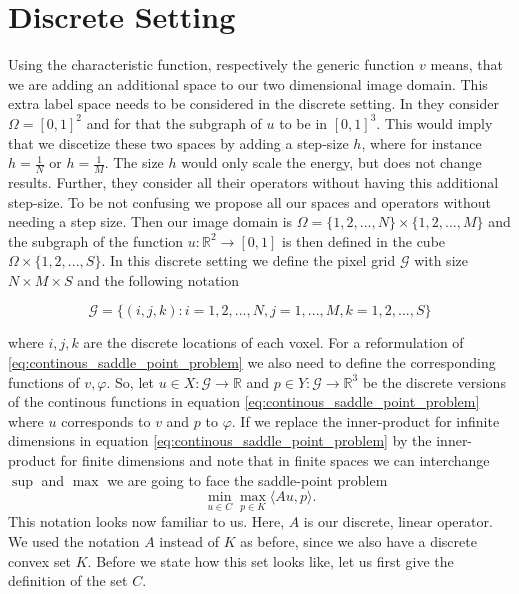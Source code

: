 \section{Discrete Setting} %
\label{sec:discrete_setting_ms}

    Using the characteristic function, respectively the generic function $v$ means, that we are adding an additional space to our two dimensional image domain. This extra label space needs to be considered in the discrete setting. In \cite{Pock-et-al-iccv09} they consider $\Omega = [0, 1]^{2}$ and for that the subgraph of $u$ to be in $[0, 1]^{3}$. This would imply that we discetize these two spaces by adding a step-size $h$, where for instance $h = \frac{1}{N}$ or $h = \frac{1}{M}$. The size $h$ would only scale the energy, but does not change results. Further, they consider all their operators without having this additional step-size. To be not confusing we propose all our spaces and operators without needing a step size. Then our image domain is $\Omega = \{1, 2, ..., N\} \times \{1, 2, ..., M\}$ and the subgraph of the function $u: \mathbb{R}^{2} \longrightarrow [0, 1]$ is then defined in the cube $\Omega \times \{1, 2, ..., S\}$. In this discrete setting we define the pixel grid $\mathcal{G}$ with size $N \times M \times S$ and the following notation

        \begin{equation}
            \mathcal{G} = \bigg\{ (i , j , k ): i = 1, 2, ..., N, j = 1, ..., M, k = 1, 2, ..., S \bigg\}
        \end{equation}

    where $i, j, k$ are the discrete locations of each voxel. For a reformulation of \ref{eq:continous_saddle_point_problem} we also need to define the corresponding functions of $v, \varphi$. So, let $u \in X: \mathcal{G} \longrightarrow \mathbb{R}$ and $p \in Y: \mathcal{G} \longrightarrow \mathbb{R}^{3}$ be the discrete versions of the continous functions in equation \ref{eq:continous_saddle_point_problem} where $u$ corresponds to $v$ and $p$ to $\varphi$. If we replace the inner-product for infinite dimensions in equation \ref{eq:continous_saddle_point_problem} by the inner-product for finite dimensions and note that in finite spaces we can interchange $\sup$ and $\max$ we are going to face the saddle-point problem
        \begin{equation}
            \min_{u \in C} \max_{p \in K} \langle Au, p \rangle.
        \label{eq:mumford_shah_saddle_point_problem}
        \end{equation}
    This notation looks now familiar to us. Here, $A$ is our discrete, linear operator. We used the notation $A$ instead of $K$ as before, since we also have a discrete convex set $K$. Before we state how this set looks like, let us first give the definition of the set $C$.

